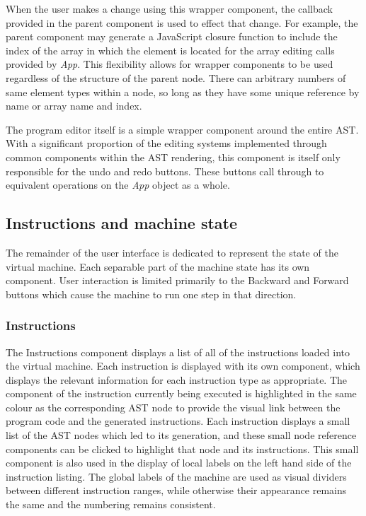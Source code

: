 When the user makes a change using this wrapper component, the callback provided in the parent component is used to effect that change. For example, the parent component may generate a JavaScript closure function to include the index of the array in which the element is located for the array editing calls provided by \textit{App}. This flexibility allows for wrapper components to be used regardless of the structure of the parent node. There can arbitrary numbers of same element types within a node, so long as they have some unique reference by name or array name and index.

The program editor itself is a simple wrapper component around the entire AST. With a significant proportion of the editing systems implemented through common components within the AST rendering, this component is itself only responsible for the undo and redo buttons. These buttons call through to equivalent operations on the \textit{App} object as a whole.

\subsection{Instructions and machine state}

The remainder of the user interface is dedicated to represent the state of the virtual machine. Each separable part of the machine state has its own component. User interaction is limited primarily to the Backward and Forward buttons which cause the machine to run one step in that direction. 

\subsubsection{Instructions}

The Instructions component displays a list of all of the instructions loaded into the virtual machine. Each instruction is displayed with its own component, which displays the relevant information for each instruction type as appropriate. The component of the instruction currently being executed is highlighted in the same colour as the corresponding AST node to provide the visual link between the program code and the generated instructions. Each instruction displays a small list of the AST nodes which led to its generation, and these small node reference components can be clicked to highlight that node and its instructions. This small component is also used in the display of local labels on the left hand side of the instruction listing. The global labels of the machine are used as visual dividers between different instruction ranges, while otherwise their appearance remains the same and the numbering remains consistent.


